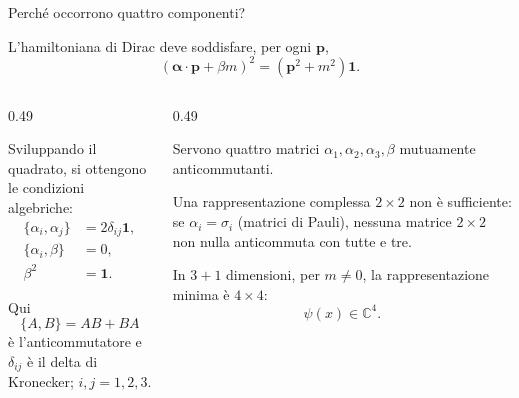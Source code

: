 \begin{frame}{Perché occorrono quattro componenti?}
\small

L'hamiltoniana di Dirac deve soddisfare,
per ogni $\mathbf p$,
\[
\left(
\boldsymbol\alpha\cdot\mathbf p+\beta m
\right)^2
=(\mathbf p^2+m^2)\mathbf1.
\]

\begin{columns}[T,onlytextwidth]
\begin{column}{0.49\textwidth}

Sviluppando il quadrato, si ottengono
le condizioni algebriche:
\[
\begin{aligned}
\{\alpha_i,\alpha_j\}
&=2\delta_{ij}\mathbf1,\\
\{\alpha_i,\beta\}&=0,\\
\beta^2&=\mathbf1.
\end{aligned}
\]

Qui
\[
\{A,B\}=AB+BA
\]
è l'anticommutatore e $\delta_{ij}$
è il delta di Kronecker;
$i,j=1,2,3$.

\end{column}
\begin{column}{0.49\textwidth}

Servono quattro matrici
$\alpha_1,\alpha_2,\alpha_3,\beta$
mutuamente anticommutanti.

Una rappresentazione complessa
$2\times2$ non è sufficiente:
se $\alpha_i=\sigma_i$
(matrici di Pauli), nessuna matrice
$2\times2$ non nulla anticommuta
con tutte e tre.

In $3+1$ dimensioni, per $m\ne0$,
la rappresentazione minima è $4\times4$:
\[
\psi(x)\in\mathbb C^4.
\]

\end{column}
\end{columns}

\end{frame}

